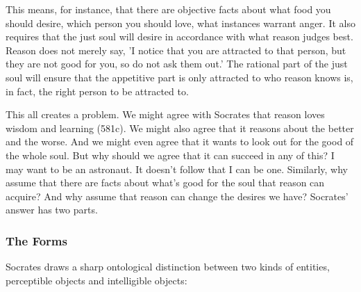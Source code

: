 \documentclass[oneside]{article}
\begin{document}
This means, for instance, that there are objective facts about  what food you should desire, which person you should love, what instances warrant anger. It also requires that the just soul will desire in accordance with what reason judges best. Reason does not merely say, 'I notice that you are attracted to that person, but they are not good for you, so do not ask them out.' The rational part of the just soul will ensure that the appetitive part is only attracted to who reason knows is, in fact, the right person to be attracted to. 

This all creates a problem.  We might agree with Socrates that reason loves wisdom and learning (581c). We might also agree that it reasons about the better and the worse. And we might even agree that it wants to look out for the good of the whole soul. But why should we agree that it can succeed in any of this? I may want to be an astronaut. It doesn't follow that I can be one. Similarly, why assume that there are facts about what's good for the soul that reason can acquire? And why assume that reason can change the desires we have? Socrates' answer has two parts. 

\subsubsection*{The Forms}

Socrates draws a sharp ontological distinction between two kinds of entities, perceptible objects and intelligible objects:
\end{document}
